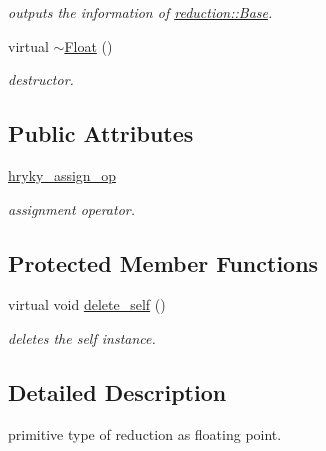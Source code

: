 \begin{DoxyCompactItemize}
\begin{DoxyCompactList}\small\item\em outputs the information of \hyperlink{classhryky_1_1reduction_1_1_base}{reduction\-::\-Base}. \end{DoxyCompactList}\item 
\hypertarget{classhryky_1_1reduction_1_1_float_a4f27def7ed62d71c89483de7daa4471c}{virtual \hyperlink{classhryky_1_1reduction_1_1_float_a4f27def7ed62d71c89483de7daa4471c}{$\sim$\-Float} ()}\label{classhryky_1_1reduction_1_1_float_a4f27def7ed62d71c89483de7daa4471c}

\begin{DoxyCompactList}\small\item\em destructor. \end{DoxyCompactList}\end{DoxyCompactItemize}
\subsection*{Public Attributes}
\begin{DoxyCompactItemize}
\item 
\hypertarget{classhryky_1_1reduction_1_1_float_a2fd470b897e136144c60d956c4407927}{\hyperlink{classhryky_1_1reduction_1_1_float_a2fd470b897e136144c60d956c4407927}{hryky\-\_\-assign\-\_\-op}}\label{classhryky_1_1reduction_1_1_float_a2fd470b897e136144c60d956c4407927}

\begin{DoxyCompactList}\small\item\em assignment operator. \end{DoxyCompactList}\end{DoxyCompactItemize}
\subsection*{Protected Member Functions}
\begin{DoxyCompactItemize}
\item 
virtual void \hyperlink{classhryky_1_1reduction_1_1_base_a100265b04179500cd7901c8afea64eb0}{delete\-\_\-self} ()
\begin{DoxyCompactList}\small\item\em deletes the self instance. \end{DoxyCompactList}\end{DoxyCompactItemize}


\subsection{Detailed Description}
primitive type of reduction as floating point. 

